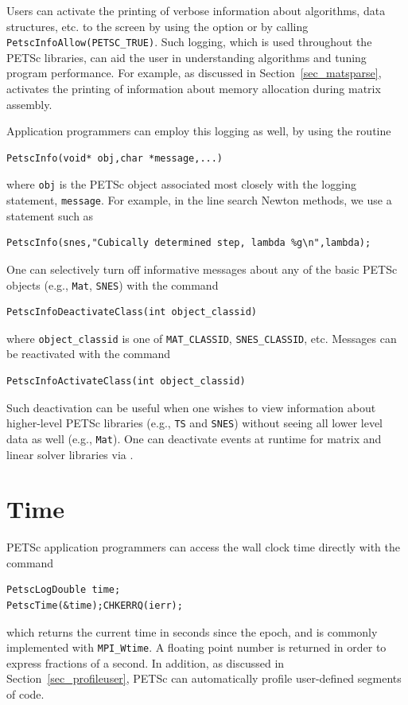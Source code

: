 {{Users can activate the printing of verbose information about
algorithms, data structures, etc. to the screen by using the option   or by calling \lstinline{PetscInfoAllow(PETSC_TRUE)}.
Such logging, which is used throughout the PETSc libraries,
can aid the user in understanding algorithms and
tuning program performance.  For example, as discussed in
Section~\ref{sec_matsparse},  activates the
printing of information about memory allocation during
matrix assembly.

Application programmers can employ this logging as well, by
using the routine
\begin{lstlisting}
PetscInfo(void* obj,char *message,...)
\end{lstlisting}
where \lstinline{obj} is the PETSc object associated most closely with
the logging statement, \lstinline{message}.
For example, in the line search Newton methods, we use a statement such as
\begin{lstlisting}
PetscInfo(snes,"Cubically determined step, lambda %g\n",lambda);
\end{lstlisting}

One can selectively turn off informative messages about any of the
basic PETSc objects (e.g., \lstinline{Mat}, \lstinline{SNES}) with the command
\begin{lstlisting}
PetscInfoDeactivateClass(int object_classid)
\end{lstlisting}
where
\lstinline{object_classid} is one of \lstinline{MAT_CLASSID}, \lstinline{SNES_CLASSID}, etc.
Messages can be reactivated with the command
\begin{lstlisting}
PetscInfoActivateClass(int object_classid)
\end{lstlisting}
Such deactivation can be useful when one wishes to view information
about higher-level PETSc libraries (e.g., \lstinline{TS} and \lstinline{SNES}) without
seeing all lower level data as well (e.g., \lstinline{Mat}).  One can deactivate
events at runtime for matrix and linear solver libraries via .

\section{Time}

PETSc application programmers can access the wall clock time directly
with the command 
\begin{lstlisting}
PetscLogDouble time;
PetscTime(&time);CHKERRQ(ierr);
\end{lstlisting}
which returns the current time in seconds since the epoch, and is commonly
implemented with \lstinline{MPI_Wtime}. A floating point number is returned in order
to express fractions of a second. In addition, as discussed in Section~\ref{sec_profileuser},
PETSc can automatically profile user-defined segments of code.

}}
